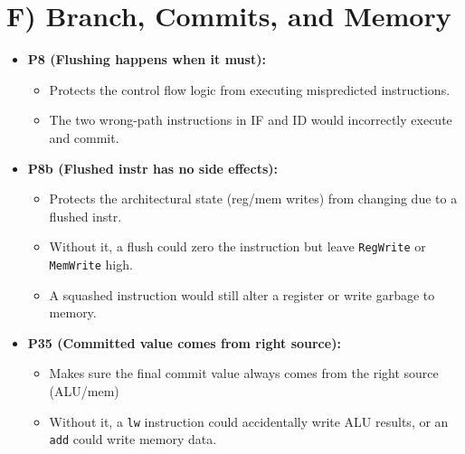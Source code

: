 \documentclass[11pt]{article}
\begin{document}
\section*{F) Branch, Commits, and Memory}
\begin{itemize}
    \item \textbf{P8 (Flushing happens when it must):} 
    \begin{itemize}
        \item Protects the control flow logic from executing mispredicted instructions.
        \item The two wrong-path instructions in IF and ID would incorrectly execute and commit.
    \end{itemize}

    \item \textbf{P8b (Flushed instr has no side effects):} 
    \begin{itemize}
        \item Protects the architectural state (reg/mem writes) from changing due to a flushed instr.
        \item Without it, a flush could zero the instruction but leave \texttt{RegWrite} or \texttt{MemWrite} high.
        \item A squashed instruction would still alter a register or write garbage to memory.
    \end{itemize}


    \item \textbf{P35 (Committed value comes from right source):} 
    \begin{itemize}
        \item Makes sure the final commit value always comes from the right source (ALU/mem)
        \item Without it, a \texttt{lw} instruction could accidentally write ALU results, or an \texttt{add} could write memory data.
    \end{itemize}


\end{itemize}
\end{document}
